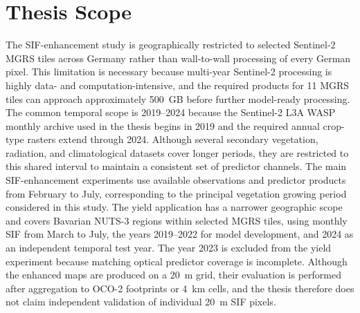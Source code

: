 \section{Thesis Scope}
The SIF-enhancement study is geographically restricted to selected Sentinel-2 MGRS tiles across Germany rather than wall-to-wall processing of every German pixel. This limitation is necessary because multi-year Sentinel-2 processing is highly data- and computation-intensive, and the required products for 11 MGRS tiles can approach approximately 500~GB before further model-ready processing. The common temporal scope is 2019--2024 because the Sentinel-2 L3A WASP monthly archive used in the thesis begins in 2019 and the required annual crop-type rasters extend through 2024. Although several secondary vegetation, radiation, and climatological datasets cover longer periods, they are restricted to this shared interval to maintain a consistent set of predictor channels. The main SIF-enhancement experiments use available observations and predictor products from February to July, corresponding to the principal vegetation growing period considered in this study. The yield application has a narrower geographic scope and covers Bavarian NUTS-3 regions within selected MGRS tiles, using monthly SIF from March to July, the years 2019--2022 for model development, and 2024 as an independent temporal test year. The year 2023 is excluded from the yield experiment because matching optical predictor coverage is incomplete. Although the enhanced maps are produced on a 20~m grid, their evaluation is performed after aggregation to OCO-2 footprints or 4~km cells, and the thesis therefore does not claim independent validation of individual 20~m SIF pixels.

